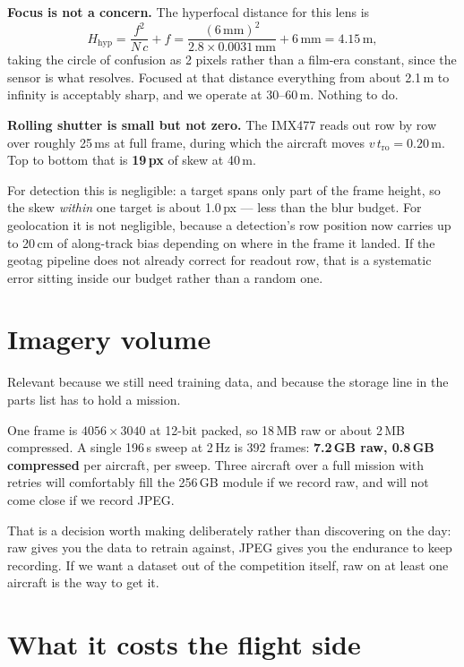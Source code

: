 \documentclass[11pt,a4paper]{article}
\begin{document}
\textbf{Focus is not a concern.} The hyperfocal distance for this lens is
\[
H_{\text{hyp}} = \frac{f^2}{N\,c} + f
= \frac{(6\,\text{mm})^2}{2.8 \times 0.0031\,\text{mm}} + 6\,\text{mm}
= 4.15\,\text{m},
\]
taking the circle of confusion as 2 pixels rather than a film-era
constant, since the sensor is what resolves. Focused at that distance
everything from about 2.1\,m to infinity is acceptably sharp, and we
operate at 30--60\,m. Nothing to do.

\textbf{Rolling shutter is small but not zero.} The IMX477 reads out row by
row over roughly 25\,ms at full frame, during which the aircraft
moves $v\,t_{\text{ro}} = 0.20$\,m. Top to bottom that is
\textbf{19\,px} of skew at 40\,m.

For detection this is negligible: a target spans only part of the frame height,
so the skew \emph{within} one target is about 1.0\,px --- less than
the blur budget. For geolocation it is not negligible, because a detection's
row position now carries up to 20\,cm of along-track bias
depending on where in the frame it landed. If the geotag pipeline does not
already correct for readout row, that is a systematic error sitting inside our
budget rather than a random one.

\section{Imagery volume}

Relevant because we still need training data, and because the storage line in
the parts list has to hold a mission.

One frame is $4056 \times 3040$ at 12-bit packed, so
18\,MB raw or about 2\,MB compressed. A single
196\,s sweep at 2\,Hz is 392 frames:
\textbf{7.2\,GB raw, 0.8\,GB compressed} per aircraft, per
sweep. Three aircraft over a full mission with retries will comfortably fill
the 256\,GB module if we record raw, and will not come close if we record JPEG.

That is a decision worth making deliberately rather than discovering on the
day: raw gives you the data to retrain against, JPEG gives you the endurance to
keep recording. If we want a dataset out of the competition itself, raw on at
least one aircraft is the way to get it.

\section{What it costs the flight side}
\end{document}
